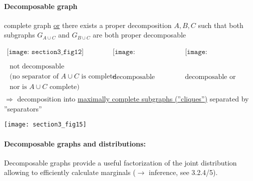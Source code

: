 \paragraph{Decomposable graph}
\begin{itemize}
	\itl complete graph \underline{or}
	\itl there exists a proper decomposition $A,B,C$ such that both 
		subgraphs $G_{A \cup C}$ and $G_{B \cup C}$ are both proper 
		decomposable
\end{itemize}
\[ \begin{array}{ccc}
	\texttt{[image: section3\_fig12]}
	& \texttt{[image: section3\_fig13]}
	& \texttt{[image: section3\_fig14]} \\\\
	\substack{ \text{not decomposable} \\
		\text{(no separator of } A \cup C \text{ is complete} \\
		\text{nor is } A \cup C \text{ complete)}}
	& \text{decomposable}
	& \text{decomposable or complete}
\end{array} \]
$\Rightarrow$ decomposition into \underline{maximally complete subgraphs (''cliques'')} separated by ''separators''

\begin{center} \texttt{[image: section3\_fig15]} \end{center}

\paragraph{Decomposable graphs and distributions: }
Decomposable graphs provide a useful factorization of the joint
distribution allowing to efficiently calculate marginals ($\rightarrow$
inference, see 3.2.4/5).


